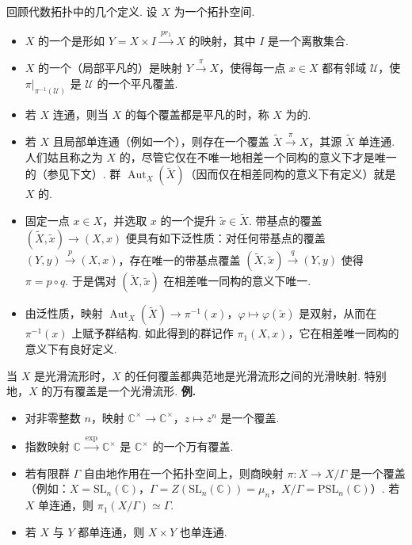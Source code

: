 \begin{numpara}[单连通性]\label{np:lie-1-3-3}
回顾代数拓扑中的几个定义. 设 $X$ 为一个拓扑空间.
\begin{itemize}[label=--]
\item $X$ 的一个是形如 $Y=X\times I\xrightarrow{\ pr_1\ }X$ 的映射，其中 $I$ 是一个离散集合.
\item $X$ 的一个（局部平凡的）是映射 $Y\xrightarrow{\ \pi\ }X$，使得每一点 $x\in X$ 都有邻域 $\mathcal U$，使 $\pi|_{\pi^{-1}(\mathcal U)}$ 是 $\mathcal U$ 的一个平凡覆盖.
\item 若 $X$ 连通，则当 $X$ 的每个覆盖都是平凡的时，称 $X$ 为的.
\item 若 $X$ 且局部单连通（例如一个），则存在一个覆盖 $\widetilde X\xrightarrow{\ \pi\ }X$，其源 $\widetilde X$ 单连通. 人们姑且称之为 $X$ 的，尽管它仅在不唯一地相差一个同构的意义下才是唯一的（参见下文）. 群 $\operatorname{Aut}_X(\widetilde X)$（因而仅在相差同构的意义下有定义）就是 $X$ 的.
\item 固定一点 $x\in X$，并选取 $x$ 的一个提升 $\widetilde x\in\widetilde X$. 带基点的覆盖 $(\widetilde X,\widetilde x)\longrightarrow(X,x)$ 便具有如下泛性质：对任何带基点的覆盖 $(Y,y)\xrightarrow{\ p\ }(X,x)$，存在唯一的带基点覆盖 $(\widetilde X,\widetilde x)\xrightarrow{\ q\ }(Y,y)$ 使得 $\pi=p\circ q$. 于是偶对 $(\widetilde X,\widetilde x)$ 在相差唯一同构的意义下唯一.
\item 由泛性质，映射 $\operatorname{Aut}_X(\widetilde X)\longrightarrow\pi^{-1}(x)$，$\varphi\mapsto\varphi(\widetilde x)$ 是双射，从而在 $\pi^{-1}(x)$ 上赋予群结构. 如此得到的群记作 $\pi_1(X,x)$，它在相差唯一同构的意义下有良好定义.
\end{itemize}
当 $X$ 是光滑流形时，$X$ 的任何覆盖都典范地是光滑流形之间的光滑映射. 特别地，$X$ 的万有覆盖是一个光滑流形.
\noindent\textbf{例.}
\begin{itemize}[label=--]
\item 对非零整数 $n$，映射 $\mathbb C^{\times}\longrightarrow\mathbb C^{\times}$，$z\mapsto z^n$ 是一个覆盖.
\item 指数映射 $\mathbb C\xrightarrow{\ \exp\ }\mathbb C^{\times}$ 是 $\mathbb C^{\times}$ 的一个万有覆盖.
\item 若有限群 $\Gamma$ 自由地作用在一个拓扑空间上，则商映射 $\pi:X\longrightarrow X/\Gamma$ 是一个覆盖（例如：$X=\mathrm{SL}_n(\mathbb C)$，$\Gamma=Z(\mathrm{SL}_n(\mathbb C))=\mu_n$，$X/\Gamma=\mathrm{PSL}_n(\mathbb C)$）. 若 $X$ 单连通，则 $\pi_1(X/\Gamma)\simeq\Gamma$.
\item 若 $X$ 与 $Y$ 都单连通，则 $X\times Y$ 也单连通.
\end{itemize}
\end{numpara}
